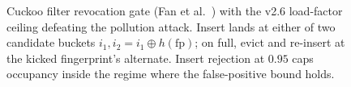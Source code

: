 \begin{figure}[H]
\caption{Cuckoo filter revocation gate (Fan et al.~\cite{fan2014cuckoo}) with the v2.6 load-factor ceiling defeating the pollution attack. Insert lands at either of two candidate buckets $i_1, i_2 = i_1 \oplus h(\mathrm{fp})$; on full, evict and re-insert at the kicked fingerprint's alternate. Insert rejection at $0.95$ caps occupancy inside the regime where the false-positive bound holds.}
\label{fig:anchor-cuckoo-diag}
\end{figure}
